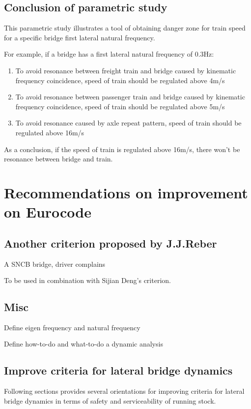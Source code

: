 \section{Conclusion of parametric study}

This parametric study illustrates a tool of obtaining danger zone for train speed for a specific bridge first lateral natural frequency. 

For example, if a bridge has a first lateral natural frequency of 0.3Hz:

\begin{enumerate}
\item To avoid resonance between freight train and bridge caused by kinematic frequency coincidence, speed of train should be regulated above 4m/s

\item To avoid resonance between passenger train and bridge caused by kinematic frequency coincidence, speed of train should be regulated above 5m/s

\item To avoid resonance caused by axle repeat pattern, speed of train should be regulated above 16m/s

\end{enumerate}

As a conclusion, if the speed of train is regulated above 16m/s, there won't be resonance between bridge and train.

\chapter{Recommendations on improvement on Eurocode}


\section{Another criterion proposed by J.J.Reber}
A SNCB bridge, driver complains 

To be used in combination with Sijian Deng's criterion.

\section{Misc}

Define eigen frequency and natural frequency

Define how-to-do and what-to-do a dynamic analysis

\section{Improve criteria for lateral bridge dynamics}
Following sections provides several orientations for improving criteria for lateral bridge dynamics in terms of safety and serviceability of running stock.


